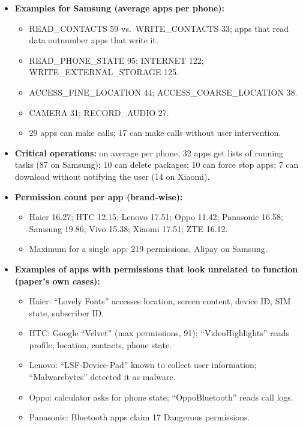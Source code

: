 \documentclass[11pt,a4paper]{article}
\begin{document}
\begin{enumerate}
\begin{itemize}[leftmargin=*, itemsep=1pt, topsep=2pt]
        \item \textbf{Examples for Samsung (average apps per phone):}
        \begin{itemize}[itemsep=0pt]
            \item READ\_CONTACTS 59 vs.\ WRITE\_CONTACTS 33; apps that read data outnumber apps that write it.
            \item READ\_PHONE\_STATE 95; INTERNET 122; WRITE\_EXTERNAL\_STORAGE 125.
            \item ACCESS\_FINE\_LOCATION 44; ACCESS\_COARSE\_LOCATION 38.
            \item CAMERA 31; RECORD\_AUDIO 27.
            \item 29 apps can make calls; 17 can make calls without user intervention.
        \end{itemize}
        \item \textbf{Critical operations:} on average per phone, 32 apps get lists of running tasks (87 on Samsung); 10 can delete packages; 10 can force stop apps; 7 can download without notifying the user (14 on Xiaomi).
        \item \textbf{Permission count per app (brand-wise):}
        \begin{itemize}[itemsep=0pt]
            \item Haier 16.27; HTC 12.15; Lenovo 17.51; Oppo 11.42; Panasonic 16.58; Samsung 19.86; Vivo 15.38; Xiaomi 17.51; ZTE 16.12.
            \item Maximum for a single app: 219 permissions, Alipay on Samsung.
        \end{itemize}
        \item \textbf{Examples of apps with permissions that look unrelated to function (paper's own cases):}
        \begin{itemize}[itemsep=0pt]
            \item Haier: ``Lovely Fonts'' accesses location, screen content, device ID, SIM state, subscriber ID.
            \item HTC: Google ``Velvet'' (max permissions, 91); ``VideoHighlights'' reads profile, location, contacts, phone state.
            \item Lenovo: ``LSF-Device-Pad'' known to collect user information; ``Malwarebytes'' detected it as malware.
            \item Oppo: calculator asks for phone state; ``OppoBluetooth'' reads call logs.
            \item Panasonic: Bluetooth apps claim 17 Dangerous permissions.

\end{itemize}
\end{itemize}
\end{enumerate}
\end{document}
